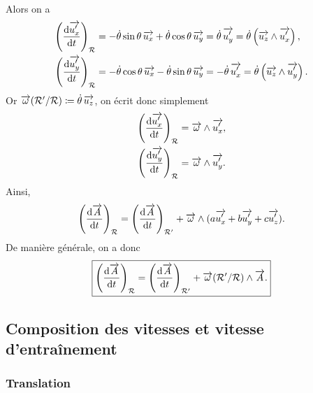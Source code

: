         Alors on a 
        \begin{equation}
            \begin{aligned}
                \left(\frac{\rmd\vec{u_x'}}{\rmd t}\right)_{\calR} &= -\dot{\theta}\sin\theta\,\vec{u_x}+\dot{\theta}\cos\theta\,\vec{u_y}=\dot{\theta}\,\vec{u_y'}=\dot{\theta}\left(\vec{u_z}\wedge\vec{u_x'}\right),\\
                \left(\frac{\rmd\vec{u_y'}}{\rmd t}\right)_{\calR} &= -\dot{\theta}\cos\theta\,\vec{u_x}-\dot{\theta}\sin\theta\,\vec{u_y}=-\dot{\theta}\,\vec{u_x'}=\dot{\theta}\left(\vec{u_z}\wedge\vec{u_y'}\right).
            \end{aligned}
        \end{equation}
        Or $\vec{\omega}(\calR'/\calR)\coloneqq\dot{\theta}\,\vec{u_z}$, on écrit donc simplement
        \begin{equation}
            \begin{aligned}
                \left(\frac{\rmd\vec{u_x'}}{\rmd t}\right)_{\calR} &=\vec{\omega}\wedge\vec{u_x'},\\
                \left(\frac{\rmd\vec{u_y'}}{\rmd t}\right)_{\calR} &=\vec{\omega}\wedge\vec{u_y'}.
            \end{aligned}
        \end{equation}
        Ainsi,
        \begin{equation}
            \left(\frac{\rmd\vec{A}}{\rmd t}\right)_{\calR}=\left(\frac{\rmd\vec{A}}{\rmd t}\right)_{\calR'}+\vec{\omega}\wedge(a\vec{u_x'}+b\vec{u_y'}+c\vec{u_z'}).
        \end{equation}
        De manière générale, on a donc 
        \begin{equation}
            \boxed{
                \left(\frac{\rmd\vec{A}}{\rmd t}\right)_{\calR}=\left(\frac{\rmd\vec{A}}{\rmd t}\right)_{\calR'}+\vec{\omega}(\calR'/\calR)\wedge\vec{A}.
            }
        \end{equation}
    
    \subsection{Composition des vitesses et vitesse d'entraînement}
        \subsubsection{Translation}


